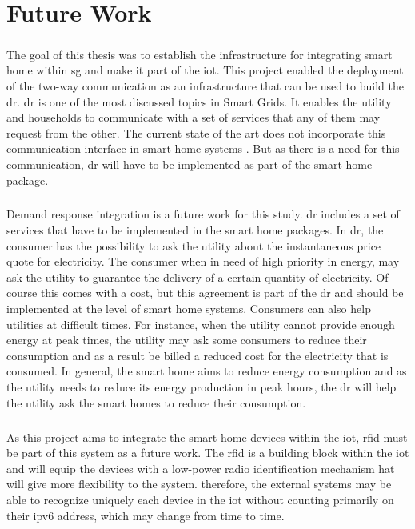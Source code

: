 \documentclass[oneside,12pt,a4paper,final]{book}
\begin{document}
\chapter{Future Work}
\paragraph{}
The goal of this thesis was to establish the infrastructure for integrating smart home within \gls{sg} and make it part of the \gls{iot}. This project enabled the deployment of the two-way communication as an infrastructure that can be used to build the \gls{dr}. \gls{dr} is one of the most discussed topics in Smart Grids. It enables the utility and households to communicate with a set of services that any of them may request from the other. The current state of the art does not incorporate this communication interface in smart home systems \cite{ref15}. But as there is a need for this communication, \gls{dr} will have to be implemented as part of the smart home package.
\paragraph{}
Demand response integration is a future work for this study. \gls{dr} includes a set of services that have to be implemented in the smart home packages. In \gls{dr}, the consumer has the possibility to ask the utility about the instantaneous price quote for electricity. The consumer when in need of high priority in energy, may ask the utility to guarantee the delivery of a certain quantity of electricity. Of course this comes with a cost, but this agreement is part of the \gls{dr} and should be implemented at the level of smart home systems. Consumers can also help utilities at difficult times. For instance, when the utility cannot provide enough energy at peak times, the utility may ask some consumers to reduce their consumption and as a result be billed a reduced cost for the electricity that is consumed. In general, the smart home aims to reduce energy consumption and as the utility needs to reduce its energy production in peak hours, the \gls{dr} will help the utility ask the smart homes to reduce their consumption.
\paragraph{}
As this project aims to integrate the smart home devices within the \gls{iot}, \gls{rfid} must be part of this system as a future work. The \gls{rfid} is a building block within the \gls{iot} and will equip the devices with a low-power radio identification mechanism hat will give more flexibility to the system. therefore, the external systems may be able to recognize uniquely each device in the \gls{iot} without counting primarily on their \gls{ipv6} address, which may change from time to time.
\end{document}
